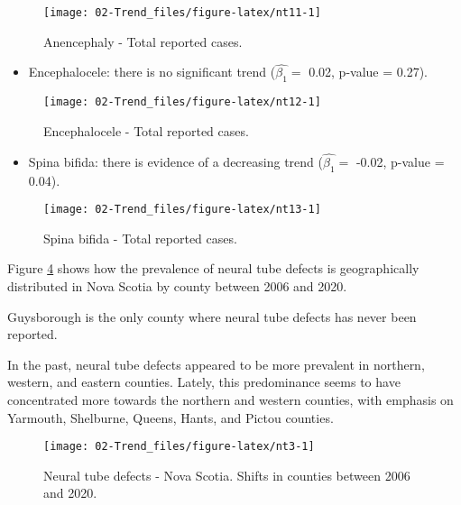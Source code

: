 \documentclass[
]{krantz}
\providecommand{\tightlist}{%
  \setlength{\itemsep}{0pt}\setlength{\parskip}{0pt}}
\begin{document}
\begin{figure}[h]

{\centering \texttt{[image: 02-Trend\_files/figure-latex/nt11-1]} 

}

\caption{Anencephaly - Total reported cases.}\label{fig:nt11}
\end{figure}

\begin{itemize}
\tightlist
\item
  Encephalocele: there is no significant trend (\(\hat{\beta_{1}} =\) 0.02, p-value = 0.27).
\end{itemize}

\begin{figure}[h]

{\centering \texttt{[image: 02-Trend\_files/figure-latex/nt12-1]} 

}

\caption{Encephalocele - Total reported cases.}\label{fig:nt12}
\end{figure}

\begin{itemize}
\tightlist
\item
  Spina bifida: there is evidence of a decreasing trend (\(\hat{\beta_{1}} =\) -0.02, p-value = 0.04).
\end{itemize}

\begin{figure}[h]

{\centering \texttt{[image: 02-Trend\_files/figure-latex/nt13-1]} 

}

\caption{Spina bifida - Total reported cases.}\label{fig:nt13}
\end{figure}

Figure \ref{fig:nt3} shows how the prevalence of neural tube defects is geographically distributed in Nova Scotia by county between 2006 and 2020.

Guysborough is the only county where neural tube defects has never been reported.

In the past, neural tube defects appeared to be more prevalent in northern, western, and eastern counties. Lately, this predominance seems to have concentrated more towards the northern and western counties, with emphasis on Yarmouth, Shelburne, Queens, Hants, and Pictou counties.

\begin{figure}[h]

{\centering \texttt{[image: 02-Trend\_files/figure-latex/nt3-1]} 

}

\caption{Neural tube defects - Nova Scotia. Shifts in counties between 2006 and 2020.}\label{fig:nt3}
\end{figure}
\end{document}
